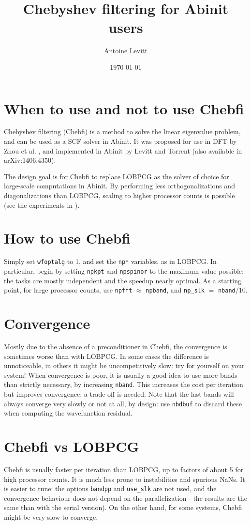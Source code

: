 \documentclass[11pt]{article}
\title{Chebyshev filtering for Abinit users}
\author{Antoine Levitt}
\date{\today}
\begin{document}
\maketitle
\tableofcontents
\section{When to use and not to use Chebfi}
Chebyshev filtering (Chebfi) is a method to solve the linear
eigenvalue problem, and can be used as a SCF solver in Abinit. It was
proposed for use in DFT by Zhou et al. \cite{zhou2006self}, and
implemented in Abinit by Levitt and Torrent \cite{levitt2014parallel} 
(also available in arXiv:1406.4350).

The design goal is for Chebfi to replace LOBPCG as the solver of
choice for large-scale computations in Abinit. By performing less
orthogonalizations and diagonalizations than LOBPCG, scaling to higher
processor counts is possible (see the experiments in
\cite{levitt2014parallel}).

\section{How to use Chebfi}
Simply set \texttt{wfoptalg} to 1, and set the \texttt{np*} variables,
as in LOBPCG. In particular, begin by setting \texttt{npkpt} and
\texttt{npspinor} to the maximum value possible: the tasks are mostly
independent and the speedup nearly optimal. As a starting point, for
large processor counts, use \texttt{npfft} $\approx$ \texttt{npband},
and \texttt{np\_slk} $=$ \texttt{nband}/10.
\section{Convergence}
Mostly due to the absence of a preconditioner in Chebfi, the
convergence is sometimes worse than with LOBPCG. In some cases the
difference is unnoticeable, in others it might be uncompetitively
slow: try for yourself on your system! When convergence is poor, it is
usually a good idea to use more bands than strictly necessary, by
increasing \texttt{nband}. This increases the cost per iteration but
improves convergence: a trade-off is needed. Note that the last bands
will always converge very slowly or not at all, by design: use
\texttt{nbdbuf} to discard these when computing the wavefunction
residual.
\section{Chebfi vs LOBPCG}
Chebfi is usually faster per iteration than LOBPCG, up to factors of
about 5 for high processor counts. It is much less prone to
instabilities and spurious NaNs. It is easier to tune: the options
\texttt{bandpp} and \texttt{use\_slk} are not used, and the
convergence behaviour does not depend on the parallelization - the
results are the same than with the serial version). On the other hand,
for some systems, Chebfi might be very slow to converge.
\end{document}
